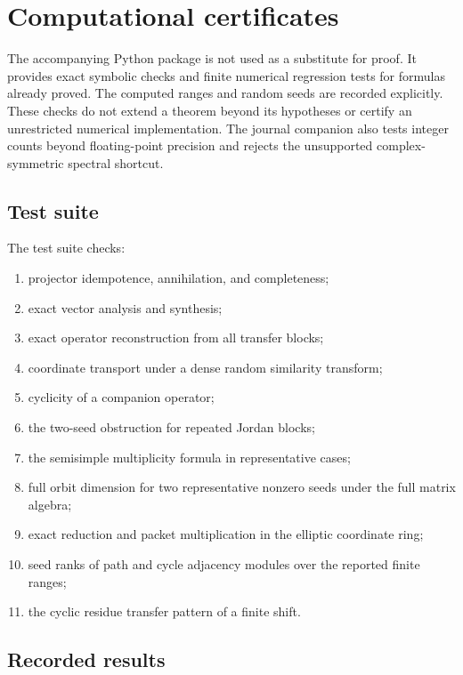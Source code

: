 \section{Computational certificates}

The accompanying Python package is not used as a substitute for proof. It provides exact symbolic checks and finite numerical regression tests for formulas already proved. The computed ranges and random seeds are recorded explicitly. These checks do not extend a theorem beyond its hypotheses or certify an unrestricted numerical implementation. The journal companion also tests integer counts beyond floating-point precision and rejects the unsupported complex-symmetric spectral shortcut.

\subsection{Test suite}

The test suite checks:
\begin{enumerate}[label=(\roman*)]
\item projector idempotence, annihilation, and completeness;
\item exact vector analysis and synthesis;
\item exact operator reconstruction from all transfer blocks;
\item coordinate transport under a dense random similarity transform;
\item cyclicity of a companion operator;
\item the two-seed obstruction for repeated Jordan blocks;
\item the semisimple multiplicity formula in representative cases;
\item full orbit dimension for two representative nonzero seeds under the full matrix algebra;
\item exact reduction and packet multiplication in the elliptic coordinate ring;
\item seed ranks of path and cycle adjacency modules over the reported finite ranges;
\item the cyclic residue transfer pattern of a finite shift.
\end{enumerate}

\subsection{Recorded results}

